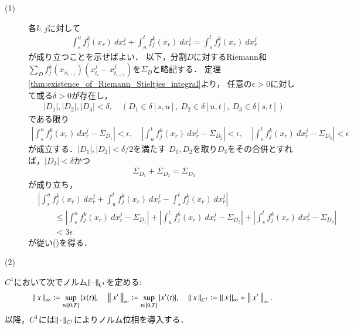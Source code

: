 \begin{prf}\mbox{}
	\begin{description}
		\item[(1)] 
			各$k,j$に対して
			\begin{align}
				\int_s^u f^k_j(x_r)\ dx^j_r
				+ \int_u^t f^k_j(x_r)\ dx^j_r
				= \int_s^t f^k_j(x_r)\ dx^j_r
				\label{eq:thm_linearity_of_Riemann_Stieltjes_integral_1}
			\end{align}
			が成り立つことを示せばよい．
			以下，分割$D$に対するRiemann和$\sum_D f^k_j(x_{s_{i-1}})(x^j_{t_i} - x^j_{t_{i-1}})$を$\Sigma_D$と略記する．
			定理\ref{thm:existence_of_Riemann_Stieltjes_integral}より，
			任意の$\epsilon > 0$に対して或る$\delta > 0$が存在し，
			\begin{align}
				|D_1|,|D_2|,|D_3| < \delta,
				\quad \left(D_1 \in \delta[s,u],\ D_2 \in \delta[u,t],\ D_3 \in \delta[s,t] \right)
			\end{align}
			である限り
			\begin{align}
				\left| \int_s^u f^k_j(x_r)\ dx^j_r - \Sigma_{D_1} \right| < \epsilon,
				\quad \left| \int_u^t f^k_j(x_r)\ dx^j_r - \Sigma_{D_2} \right| < \epsilon,
				\quad \left| \int_s^t f^k_j(x_r)\ dx^j_r - \Sigma_{D_3} \right| < \epsilon
			\end{align}
			が成立する．$|D_1|,|D_2| < \delta/2$を満たす
			$D_1,D_2$を取り$D_3$をその合併とすれば，$|D_3| < \delta$かつ
			\begin{align}
				\Sigma_{D_1} + \Sigma_{D_2} = \Sigma_{D_3}
			\end{align}
			が成り立ち，
			\begin{align}
				&\left| \int_s^u f^k_j(x_r)\ dx^j_r + \int_u^t f^k_j(x_r)\ dx^j_r
					- \int_s^t f^k_j(x_r)\ dx^j_r \right| \\
				&\qquad \leq \left| \int_s^u f^k_j(x_r)\ dx^j_r - \Sigma_{D_1} \right|
				+ \left| \int_u^t f^k_j(x_r)\ dx^j_r - \Sigma_{D_2} \right|
				+ \left| \int_s^t f^k_j(x_r)\ dx^j_r - \Sigma_{D_3} \right| \\
				&\qquad < 3\epsilon
			\end{align}
			が従い()を得る．
		
		\item[(2)]
	\end{description}
\end{prf}
$C^1$において次でノルム$\left\|\, \cdot\, \right\|_{C^1}$を定める:
\begin{align}
	\left\|\, x\, \right\|_{\infty} \coloneqq \operatorname*{sup}_{t \in [0,T]} |x(t)|,
	\quad \left\|\, x'\, \right\|_{\infty} \coloneqq \operatorname*{sup}_{t \in [0,T]} |x'(t)|,
	\quad \left\|\, x\, \right\|_{C^1} \coloneqq
	\left\|\, x\, \right\|_{\infty} + \left\|\, x'\, \right\|_{\infty}.
\end{align}
以降，$C^1$には$\left\|\, \cdot\, \right\|_{C^1}$によりノルム位相を導入する．

